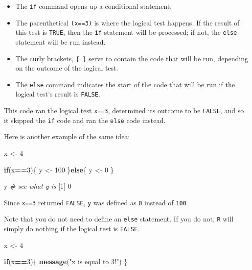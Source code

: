 \documentclass[
]{book}
\newenvironment{Shaded}{\begin{snugshade}}{\end{snugshade}}
\newcommand{\CommentTok}[1]{\textcolor[rgb]{0.56,0.35,0.01}{\textit{#1}}}
\newcommand{\ControlFlowTok}[1]{\textcolor[rgb]{0.13,0.29,0.53}{\textbf{#1}}}
\newcommand{\DecValTok}[1]{\textcolor[rgb]{0.00,0.00,0.81}{#1}}
\newcommand{\KeywordTok}[1]{\textcolor[rgb]{0.13,0.29,0.53}{\textbf{#1}}}
\newcommand{\NormalTok}[1]{#1}
\newcommand{\OperatorTok}[1]{\textcolor[rgb]{0.81,0.36,0.00}{\textbf{#1}}}
\newcommand{\StringTok}[1]{\textcolor[rgb]{0.31,0.60,0.02}{#1}}
\providecommand{\tightlist}{%
  \setlength{\itemsep}{0pt}\setlength{\parskip}{0pt}}
\begin{document}
\begin{itemize}
\tightlist
\item
  The \texttt{if} command opens up a conditional statement.
\item
  The parenthetical \texttt{(x==3)} is where the logical test happens. If the result of this test is \texttt{TRUE}, then the \texttt{if} statement will be processed; if not, the \texttt{else} statement will be run instead.
\item
  The curly brackets, \texttt{\{\ \}} serve to contain the code that will be run, depending on the outcome of the logical test.
\item
  The \texttt{else} command indicates the start of the code that will be run if the logical test's result is \texttt{FALSE}.
\end{itemize}

This code ran the logical test \texttt{x==3}, determined its outcome to be \texttt{FALSE}, and so it skipped the \texttt{if} code and ran the \texttt{else} code instead.

Here is another example of the same idea:

\begin{Shaded}
\begin{Highlighting}[]
\NormalTok{x <-}\StringTok{ }\DecValTok{4}

\ControlFlowTok{if}\NormalTok{(x}\OperatorTok{==}\DecValTok{3}\NormalTok{)\{}
\NormalTok{  y <-}\StringTok{ }\DecValTok{100}
\NormalTok{\}}\ControlFlowTok{else}\NormalTok{\{}
\NormalTok{  y <-}\StringTok{ }\DecValTok{0}
\NormalTok{\}}

\NormalTok{y }\CommentTok{# see what y is}
\NormalTok{[}\DecValTok{1}\NormalTok{] }\DecValTok{0}
\end{Highlighting}
\end{Shaded}

Since \texttt{x==3} returned \texttt{FALSE}, \texttt{y} was defined as \texttt{0} instead of \texttt{100}.

Note that you do not need to define an \texttt{else} statement. If you do not, \texttt{R} will simply do nothing if the logical test is \texttt{FALSE}.

\begin{Shaded}
\begin{Highlighting}[]
\NormalTok{x <-}\StringTok{ }\DecValTok{4}

\ControlFlowTok{if}\NormalTok{(x}\OperatorTok{==}\DecValTok{3}\NormalTok{)\{}
  \KeywordTok{message}\NormalTok{(}\StringTok{"x is equal to 3!"}\NormalTok{)}
\NormalTok{\}}
\end{Highlighting}
\end{Shaded}
\end{document}
